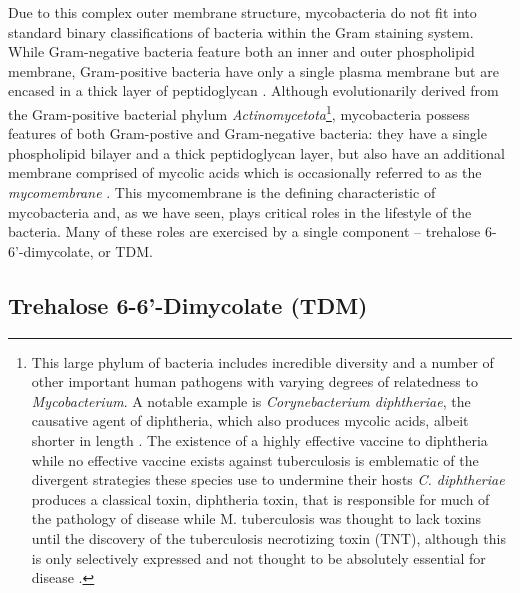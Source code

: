 Due to this complex outer membrane structure, mycobacteria do not fit into standard binary classifications of bacteria within the Gram staining system. While Gram\hyp{}negative bacteria feature both an inner and outer phospholipid membrane, Gram\hyp{}positive bacteria have only a single plasma membrane but are encased in a thick layer of peptidoglycan \citep{Carlone1982, Salton1953}. Although evolutionarily derived from the Gram\hyp{}positive bacterial phylum \textit{Actinomycetota}\footnote{This large phylum of bacteria includes incredible diversity and a number of other important human pathogens with varying degrees of relatedness to \textit{Mycobacterium}. A notable example is \textit{Corynebacterium diphtheriae}, the causative agent of diphtheria, which also produces mycolic acids, albeit shorter in length \citep{vanderPeet2015}. The existence of a highly effective vaccine to diphtheria while no effective vaccine exists against tuberculosis is emblematic of the divergent strategies these species use to undermine their hosts \textit{C. diphtheriae} produces a classical toxin, diphtheria toxin, that is responsible for much of the pathology of disease while M. tuberculosis was thought to lack toxins until the discovery of the tuberculosis necrotizing toxin (TNT), although this is only selectively expressed and not thought to be absolutely essential for disease \citep{Danilchanka2014, Pajuelo2018, Pajuelo2020, Pajuelo2021, Tak2019, Tak2021, IzquierdoLafuente2021, Sun2015}.}, mycobacteria possess features of both Gram\hyp{}postive and Gram\hyp{}negative bacteria: they have a single phospholipid bilayer and a thick peptidoglycan layer, but also have an additional membrane comprised of mycolic acids which is occasionally referred to as the \textit{mycomembrane} \citep{Jankute2015, Brennan2003, Brennan1995, Chatterjee1997}. This mycomembrane is the defining characteristic of mycobacteria and, as we have seen, plays critical roles in the lifestyle of the bacteria. Many of these roles are exercised by a single component -- trehalose 6\hyp{}6'\hyp{}dimycolate, or TDM.

\subsection{Trehalose 6\hyp{}6'\hyp{}Dimycolate (TDM)}\label{tdm}

